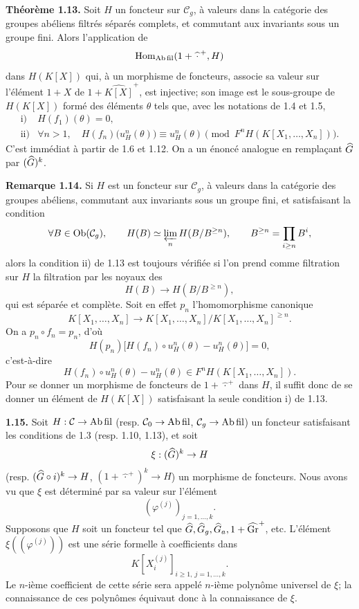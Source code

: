 \documentclass[11pt]{article}
\begin{document}
\textbf{Théorème 1.13.} Soit \(H\) un foncteur sur \(\mathcal C_g\), à valeurs dans la catégorie des groupes abéliens filtrés séparés complets, et commutant aux invariants sous un groupe fini. Alors l'application de
\[
  \operatorname{Hom}_{\mathrm{Ab\,fil}}(1+\widehat{\,\cdot\,}^{+},H)
\]
dans \(H(K[X])\) qui, à un morphisme de foncteurs, associe sa valeur sur l'élément \(1+X\) de \(1+\widehat{K[X]}^+\), est injective; son image est le sous-groupe de \(H(K[X])\) formé des éléments \(\theta\) tels que, avec les notations de 1.4 et 1.5,
\[
\begin{array}{ll}
\text{i)}& H(f_1)(\theta)=0,\\[0.3em]
\text{ii)}& \forall n>1,\quad
H(f_n)\bigl(u_H^n(\theta)\bigr)\equiv u_H^n(\theta)
\pmod{F^nH(K[X_1,\ldots,X_n])}.
\end{array}
\]
C'est immédiat à partir de 1.6 et 1.12. On a un énoncé analogue en remplaçant \(\widehat G\) par \((\widehat G)^k\).

\textbf{Remarque 1.14.} Si \(H\) est un foncteur sur \(\mathcal C_g\), à valeurs dans la catégorie des groupes abéliens, commutant aux invariants sous un groupe fini, et satisfaisant la condition
\[
  \forall B\in\operatorname{Ob}(\mathcal C_g),\qquad
  H(B)\simeq\varprojlim_n H(B/B^{\geq n}),\qquad
  B^{\geq n}=\prod_{i\geq n}B^i,
\]
alors la condition ii) de 1.13 est toujours vérifiée si l'on prend comme filtration sur \(H\) la filtration par les noyaux des
\[
  H(B)\longrightarrow H(B/B^{\geq n}),
\]
qui est séparée et complète. Soit en effet \(p_n\) l'homomorphisme canonique
\[
  K[X_1,\ldots,X_n]\longrightarrow K[X_1,\ldots,X_n]/K[X_1,\ldots,X_n]^{\geq n}.
\]
On a \(p_n\circ f_n=p_n\), d'où
\[
  H(p_n)\bigl[H(f_n)\circ u_H^n(\theta)-u_H^n(\theta)\bigr]=0,
\]
c'est-à-dire
\[
  H(f_n)\circ u_H^n(\theta)-u_H^n(\theta)
  \in F^nH(K[X_1,\ldots,X_n]).
\]
Pour se donner un morphisme de foncteurs de \(1+\widehat{\,\cdot\,}^{+}\) dans \(H\), il suffit donc de se donner un élément de \(H(K[X])\) satisfaisant la seule condition i) de 1.13.

\textbf{1.15.} Soit \(H:\mathcal C\to\mathrm{Ab\,fil}\) (resp. \(\mathcal C_0\to\mathrm{Ab\,fil}\), \(\mathcal C_g\to\mathrm{Ab\,fil}\)) un foncteur satisfaisant les conditions de 1.3 (resp. 1.10, 1.13), et soit
\[
  \xi:(\widehat G)^k\to H
\]
(resp. \((\widehat G\circ i)^k\to H\), \((1+\widehat{\,\cdot\,}^{+})^k\to H\)) un morphisme de foncteurs. Nous avons vu que \(\xi\) est déterminé par sa valeur sur l'élément
\[
  (\varphi^{(j)})_{j=1,\ldots,k}.
\]
Supposons que \(H\) soit un foncteur tel que \(\widehat G,\widehat G_g,\widehat G_a,1+\widehat{\operatorname{Gr}}^{+}\), etc. L'élément \(\xi((\varphi^{(j)}))\) est une série formelle à coefficients dans
\[
  K[X_i^{(j)}]_{i\geq1,\ j=1,\ldots,k}.
\]
Le \(n\)-ième coefficient de cette série sera appelé \(n\)-ième polynôme universel de \(\xi\); la connaissance de ces polynômes équivaut donc à la connaissance de \(\xi\).
\end{document}

